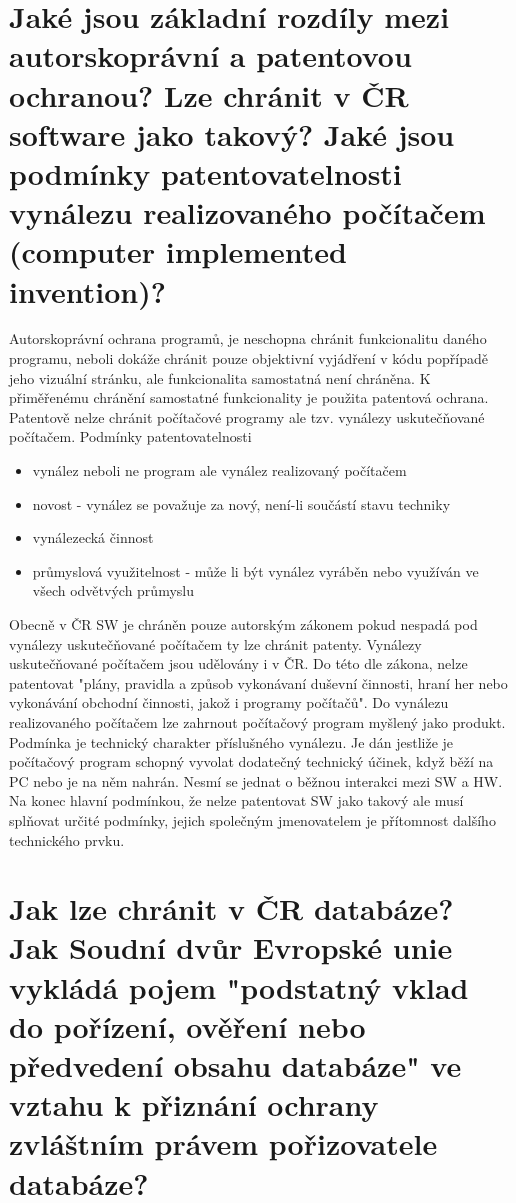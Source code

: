 \documentclass[12pt,a4paper,czech]{article}
\newcommand{\nadpis}[1]{{\section{#1}}}
\begin{document}
\vspace{0.5cm} 
\nadpis{Jaké jsou základní rozdíly mezi autorskoprávní a patentovou ochranou? Lze chránit v ČR software jako takový? Jaké jsou podmínky patentovatelnosti vynálezu realizovaného počítačem (computer implemented invention)?}

Autorskoprávní ochrana programů, je neschopna chránit funkcionalitu daného programu, neboli dokáže chránit pouze objektivní vyjádření v kódu popřípadě jeho vizuální stránku, ale funkcionalita samostatná není chráněna. K přiměřenému chránění samostatné funkcionality je použita patentová ochrana. Patentově nelze chránit počítačové programy ale tzv. vynálezy uskutečňované počítačem.\vspace{0.5cm}\newline
Podmínky patentovatelnosti
\begin{itemize}
    \setlength\itemsep{0em}
    \item  vynález neboli ne program ale vynález realizovaný počítačem
    \item novost - vynález se považuje za nový, není-li součástí stavu techniky
    \item vynálezecká činnost
    \item průmyslová využitelnost - může li být vynález vyráběn nebo využíván ve všech odvětvých průmyslu
\end{itemize}
Obecně v ČR SW je chráněn pouze autorským zákonem pokud nespadá pod vynálezy uskutečňované počítačem ty lze chránit patenty.  
Vynálezy uskutečňované počítačem jsou udělovány i v ČR. Do této dle zákona, nelze patentovat "plány, pravidla a způsob vykonávaní duševní činnosti, hraní her nebo vykonávání obchodní činnosti, jakož i programy počítačů".
Do vynálezu realizovaného počítačem lze zahrnout počítačový program myšlený jako produkt. Podmínka je technický charakter příslušného vynálezu. Je dán jestliže je počítačový program schopný vyvolat dodatečný technický účinek, když běží na PC nebo je na něm nahrán. Nesmí se jednat o běžnou interakci mezi SW a HW.  
Na konec hlavní podmínkou, že nelze patentovat SW jako takový ale musí splňovat určité podmínky, jejich společným jmenovatelem je přítomnost dalšího technického prvku. 


\vspace{0.5cm} 
\nadpis{Jak lze chránit v ČR databáze? Jak Soudní dvůr Evropské unie vykládá pojem "podstatný vklad do pořízení, ověření nebo předvedení obsahu databáze" ve vztahu k přiznání ochrany zvláštním právem pořizovatele databáze?}
\end{document}
